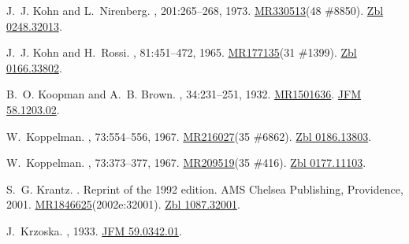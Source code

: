 \documentclass[11pt,a4paper, final, twoside]{article}
\numberwithin{equation}{section}
\begin{document}
\begin{appendices}
\begin{thebibliography}{100}
J.~J. Kohn and L.~Nirenberg.
, 201:265--268, 1973.
\newblock \href{http://www.ams.org/mathscinet-getitem?mr=330513}{MR330513}(48
  \#8850). \href{http://zbmath.org/?q=an:0248.32013}{Zbl 0248.32013}.

J.~J. Kohn and H.~Rossi.
, 81:451--472, 1965.
\newblock \href{http://www.ams.org/mathscinet-getitem?mr=177135}{MR177135}(31
  \#1399). \href{http://zbmath.org/?q=an:0166.33802}{Zbl 0166.33802}.

B.~O. Koopman and A.~B. Brown.
,
  34:231--251, 1932.
\newblock \href{http://www.ams.org/mathscinet-getitem?mr=1501636}{MR1501636}.
  \href{http://zbmath.org/?q=an:58.1203.02}{JFM 58.1203.02}.

W.~Koppelman.
, 73:554--556,
  1967.
\newblock \href{http://www.ams.org/mathscinet-getitem?mr=216027}{MR216027}(35
  \#6862). \href{http://zbmath.org/?q=an:0186.13803}{Zbl 0186.13803}.

W.~Koppelman.
, 73:373--377,
  1967.
\newblock \href{http://www.ams.org/mathscinet-getitem?mr=209519}{MR209519}(35
  \#416). \href{http://zbmath.org/?q=an:0177.11103}{Zbl 0177.11103}.

S.~G. Krantz.
.
\newblock Reprint of the 1992 edition. AMS Chelsea Publishing, Providence,
  2001.
\newblock
  \href{http://www.ams.org/mathscinet-getitem?mr=1846625}{MR1846625}(2002e:32001).
  \href{http://zbmath.org/?q=an:1087.32001}{Zbl 1087.32001}.

J.~Krzoska.
, 1933.
\newblock \href{http://zbmath.org/?q=an:59.0342.01}{JFM 59.0342.01}.


\end{thebibliography}
\end{appendices}
\end{document}
